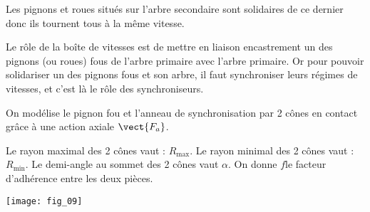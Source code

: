 Les pignons et roues situés sur l’arbre secondaire sont solidaires de ce dernier donc ils tournent tous à la même vitesse. 

Le rôle de la boîte de vitesses est de mettre en liaison encastrement un des pignons (ou roues) fous de l’arbre primaire avec l’arbre primaire. Or pour pouvoir solidariser un des pignons fous et son arbre, il faut synchroniser leurs régimes de vitesses, et c'est là le rôle des synchroniseurs. 


On modélise le pignon fou et l'anneau de synchronisation par 2 cônes en contact 
grâce à une action axiale $\vect{F_a}$. 
 
Le rayon maximal des 2 cônes vaut : $R_{\text{max}}$. 
Le rayon minimal des 2 cônes vaut : $R_{\text{min}}$. 
Le demi-angle au sommet des 2 cônes vaut $\alpha$. 
On donne $f$le facteur d’adhérence 
entre les deux pièces.



\begin{marginfigure}
\texttt{[image: fig\_09]}
\end{marginfigure}








%
%
%
%
%
%
%
%
%
%
%
%


